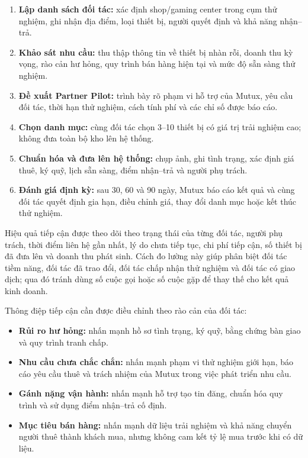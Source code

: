 \begin{enumerate}
    \item \textbf{Lập danh sách đối tác:} xác định shop/gaming center trong cụm thử nghiệm, ghi nhận địa điểm, loại thiết bị, người quyết định và khả năng nhận--trả.
    \item \textbf{Khảo sát nhu cầu:} thu thập thông tin về thiết bị nhàn rỗi, doanh thu kỳ vọng, rào cản hư hỏng, quy trình bán hàng hiện tại và mức độ sẵn sàng thử nghiệm.
    \item \textbf{Đề xuất Partner Pilot:} trình bày rõ phạm vi hỗ trợ của Mutux, yêu cầu đối tác, thời hạn thử nghiệm, cách tính phí và các chỉ số được báo cáo.
    \item \textbf{Chọn danh mục:} cùng đối tác chọn 3--10 thiết bị có giá trị trải nghiệm cao; không đưa toàn bộ kho lên hệ thống.
    \item \textbf{Chuẩn hóa và đưa lên hệ thống:} chụp ảnh, ghi tình trạng, xác định giá thuê, ký quỹ, lịch sẵn sàng, điểm nhận--trả và người phụ trách.
    \item \textbf{Đánh giá định kỳ:} sau 30, 60 và 90 ngày, Mutux báo cáo kết quả và cùng đối tác quyết định gia hạn, điều chỉnh giá, thay đổi danh mục hoặc kết thúc thử nghiệm.
\end{enumerate}

Hiệu quả tiếp cận được theo dõi theo trạng thái của từng đối tác, người phụ trách, thời điểm liên hệ gần nhất, lý do chưa tiếp tục, chi phí tiếp cận, số thiết bị đã đưa lên và doanh thu phát sinh. Cách đo lường này giúp phân biệt đối tác tiềm năng, đối tác đã trao đổi, đối tác chấp nhận thử nghiệm và đối tác có giao dịch; qua đó tránh dùng số cuộc gọi hoặc số cuộc gặp để thay thế cho kết quả kinh doanh.

Thông điệp tiếp cận cần được điều chỉnh theo rào cản của đối tác:

\begin{itemize}
    \item \textbf{Rủi ro hư hỏng:} nhấn mạnh hồ sơ tình trạng, ký quỹ, bằng chứng bàn giao và quy trình tranh chấp.
    \item \textbf{Nhu cầu chưa chắc chắn:} nhấn mạnh phạm vi thử nghiệm giới hạn, báo cáo yêu cầu thuê và trách nhiệm của Mutux trong việc phát triển nhu cầu.
    \item \textbf{Gánh nặng vận hành:} nhấn mạnh hỗ trợ tạo tin đăng, chuẩn hóa quy trình và sử dụng điểm nhận--trả cố định.
    \item \textbf{Mục tiêu bán hàng:} nhấn mạnh dữ liệu trải nghiệm và khả năng chuyển người thuê thành khách mua, nhưng không cam kết tỷ lệ mua trước khi có dữ liệu.
\end{itemize}


